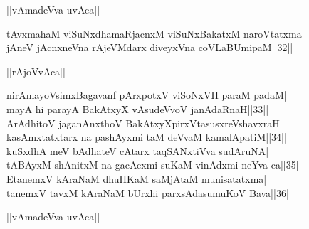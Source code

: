\documentclass{article}
\begin{document}
\begin{center}
||vAmadeVva uvAca||
\end{center}

tAvxmahaM viSuNxdhamaRjacnxM viSuNxBakatxM naroVtatxma|\\
jAneV jAcnxneVna rAjeVMdarx diveyxVna coVLaBUmipaM||32||\\

\begin{center}
||rAjoVvAca||
\end{center}

nirAmayoVsimxBagavanf pArxpotxV viSoNxVH paraM padaM|\\
mayA hi parayA BakAtxyX vAsudeVvoV janAdaRnaH||33||\\
ArAdhitoV jaganAnxthoV BakAtxyXpirxVtasusxreVshavxraH|\\
kasAmxtatxtarx na pashAyxmi taM deVvaM kamalApatiM||34||\\
kuSxdhA meV bAdhateV cAtarx taqSANxtiVva sudAruNA|\\
tABAyxM shAnitxM na gacAcxmi suKaM vinAdxmi neYva ca||35||\\
EtanemxV kAraNaM dhuHKaM saMjAtaM munisatatxma|\\
tanemxV tavxM kAraNaM bUrxhi parxsAdasumuKoV Bava||36||\\

\begin{center}
||vAmadeVva uvAca||
\end{center}
\end{document}
